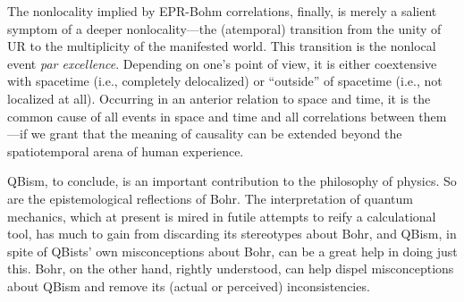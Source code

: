 \documentclass[12pt]{article}
\begin{document}
The nonlocality implied by EPR-Bohm correlations, finally, is merely a salient symptom of a deeper nonlocality---the (atemporal) transition from the unity of UR to the multiplicity of the manifested world. This transition is the nonlocal event \emph{par excellence}. Depending on one's point of view, it is either coextensive with spacetime (i.e., completely delocalized) or ``outside'' of spacetime (i.e., not localized at all). Occurring in an anterior relation to space and time, it is the common cause of all events in space and time and all correlations between them---if we grant that the meaning of causality can be extended beyond the spatiotemporal arena of human experience.

QBism, to conclude, is an important contribution to the philosophy of physics. So are the epistemological reflections of Bohr. The interpretation of quantum mechanics, which at present is mired in futile attempts to reify a calculational tool, has much to gain from discarding its stereotypes about Bohr, and QBism, in spite of QBists' own misconceptions about Bohr, can be a great help in doing just this. Bohr, on the other hand, rightly understood, can help dispel misconceptions about QBism and remove its (actual or perceived) inconsistencies.
\end{document}
